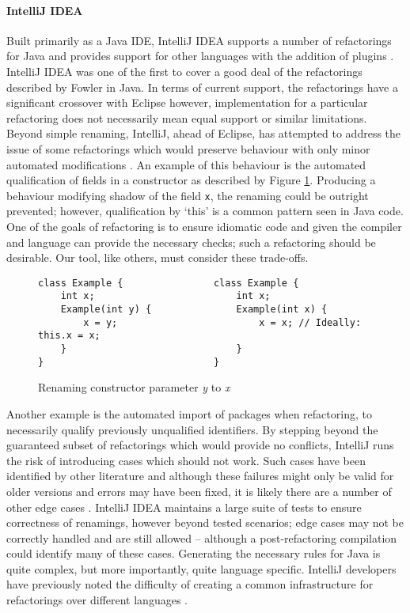 \paragraph{IntelliJ IDEA}
Built primarily as a Java IDE, IntelliJ IDEA supports a number of refactorings for Java and provides support for other languages with the addition of plugins \cite{jetbrains15}. IntelliJ IDEA was one of the first to cover a good deal of the refactorings described by Fowler in Java. In terms of current support, the refactorings have a significant crossover with Eclipse however, implementation for a particular refactoring does not necessarily mean equal support or similar limitations. Beyond simple renaming, IntelliJ, ahead of Eclipse, has attempted to address the issue of some refactorings which would preserve behaviour with only minor automated modifications \cite{schafer2010specification}. An example of this behaviour is the automated qualification of fields in a constructor as described by Figure \ref{Fig:qual}. Producing a behaviour modifying shadow of the field {\verb|x|}, the renaming could be outright prevented; however, qualification by `this' is a common pattern seen in Java code. One of the goals of refactoring is to ensure idiomatic code and given the compiler and language can provide the necessary checks; such a refactoring should be desirable. Our tool, like others, must consider these trade-offs.

\begin{center}
\begin{figure}
\begin{verbatim}
class Example {                class Example {
    int x;                         int x;
    Example(int y) {               Example(int x) {
        x = y;                         x = x; // Ideally: this.x = x;
    }                              }
}                              }
\end{verbatim}
\caption{Renaming constructor parameter \emph{y} to \emph{x}}
\label{Fig:qual}
\end{figure}
\end{center}

Another example is the automated import of packages when refactoring, to necessarily qualify previously unqualified identifiers. By stepping beyond the guaranteed subset of refactorings which would provide no conflicts, IntelliJ runs the risk of introducing cases which should not work. Such cases have been identified by other literature and although these failures might only be valid for older versions and errors may have been fixed, it is likely there are a number of other edge cases \cite{jemerov2008implementing}. IntelliJ IDEA maintains a large suite of tests to ensure correctness of renamings, however beyond tested scenarios; edge cases may not be correctly handled and are still allowed -- although a post-refactoring compilation could identify many of these cases. Generating the necessary rules for Java is quite complex, but more importantly, quite language specific. IntelliJ developers have previously noted the difficulty of creating a common infrastructure for refactorings over different languages \cite{jemerov2008implementing}.

